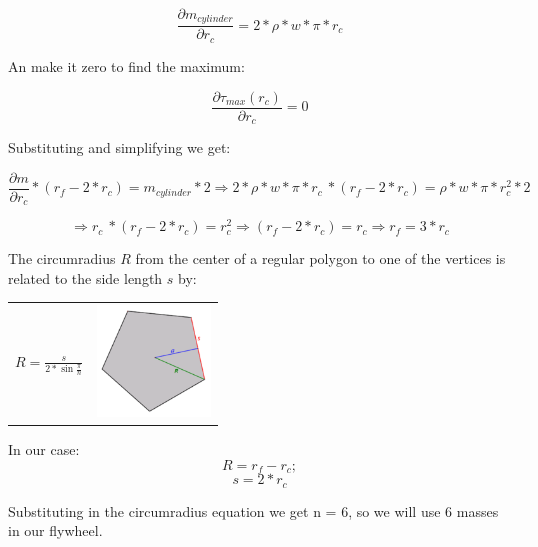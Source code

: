 \[ \frac{\partial  m_{cylinder}}{\partial r_c} = 2 * \rho * w * \pi *  r_c\]

An make it zero to find the maximum:

\[\frac{\partial \tau _{max} (r_c)}{\partial r_c} = 0\]

Substituting and simplifying we get:

\[\frac{\partial m}{\partial r_c} * (r_f - 2 * r_c) =   m_{cylinder} * 2 \Rightarrow 2 * \rho * w * \pi *  r_c\ * (r_f - 2 * r_c) = \rho * w * \pi * r_c^2 * 2 \]

\[ \Rightarrow r_c\ * (r_f - 2 * r_c) =  r_c^2 \Rightarrow (r_f - 2 * r_c) =  r_c \Rightarrow r_f = 3 * r_c\]


The circumradius $R$ from the center of a regular polygon to one of the vertices is related to the side length $s$ by:

\begin{center}
	\begin{tabular}{ c  c }
		\(\displaystyle R=\frac {s}{2* \sin{\frac {\pi} {n}}} \)
		& 
		\includegraphics[width=3cm]{img/PolygonParameters.png}
	\end{tabular}
\end{center}

In our case:
\[ R = r_f - r_c; \]
\[ s = 2 * r_c\]

Substituting in the circumradius equation we get n = 6, so we will use 6 masses in our flywheel.